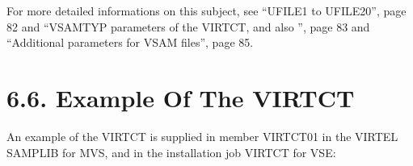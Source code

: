 \documentclass[letterpaper,10pt,english]{sphinxmanual}
\begin{document}
For more detailed informations on this subject, see “UFILE1 to UFILE20”, page 82 and “VSAMTYP parameters of the VIRTCT, and also ”, page 83 and “Additional parameters for VSAM files”, page 85.


\section{6.6. Example Of The VIRTCT}
\label{\detokenize{Installation_Guide:example-of-the-virtct}}
An example of the VIRTCT is supplied in member VIRTCT01 in the VIRTEL SAMPLIB for MVS, and in the installation job VIRTCT for VSE:

\begin{sphinxVerbatim}[commandchars=\\\{\}]
 
  
         
             
           
             
            
         
         
          
          
         
         
         

\end{sphinxVerbatim}
\end{document}
